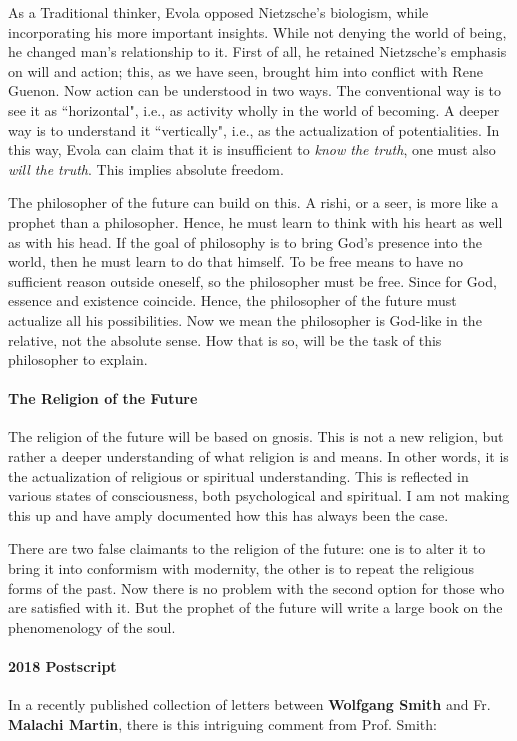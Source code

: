 As a Traditional thinker, Evola opposed Nietzsche's biologism, while incorporating his more important insights. While not denying the world of being, he changed man's relationship to it. First of all, he retained Nietzsche's emphasis on will and action; this, as we have seen, brought him into conflict with Rene Guenon. Now action can be understood in two ways. The conventional way is to see it as ``horizontal", i.e., as activity wholly in the world of becoming. A deeper way is to understand it ``vertically", i.e., as the actualization of potentialities. In this way, Evola can claim that it is insufficient to \emph{know the truth}, one must also \emph{will the truth}. This implies absolute freedom.

The philosopher of the future can build on this. A rishi, or a seer, is more like a prophet than a philosopher. Hence, he must learn to think with his heart as well as with his head. If the goal of philosophy is to bring God's presence into the world, then he must learn to do that himself. To be free means to have no sufficient reason outside oneself, so the philosopher must be free. Since for God, essence and existence coincide. Hence, the philosopher of the future must actualize all his possibilities. Now we mean the philosopher is God-like in the relative, not the absolute sense. How that is so, will be the task of this philosopher to explain.

\paragraph{The Religion of the Future}
The religion of the future will be based on gnosis. This is not a new religion, but rather a deeper understanding of what religion is and means. In other words, it is the actualization of religious or spiritual understanding. This is reflected in various states of consciousness, both psychological and spiritual. I am not making this up and have amply documented how this has always been the case.

There are two false claimants to the religion of the future: one is to alter it to bring it into conformism with modernity, the other is to repeat the religious forms of the past. Now there is no problem with the second option for those who are satisfied with it. But the prophet of the future will write a large book on the phenomenology of the soul.


\hfill

\paragraph{2018 Postscript}
In a recently published collection of letters between \textbf{Wolfgang Smith} and Fr. \textbf{Malachi Martin}, there is this intriguing comment from Prof. Smith:

